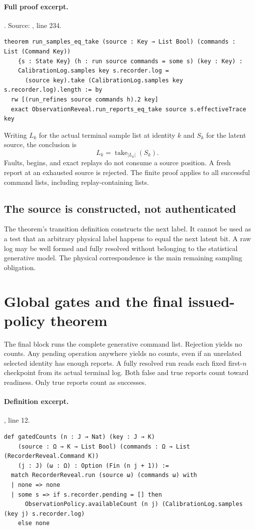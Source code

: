 \documentclass[11pt]{article}
\begin{document}
\paragraph{Full proof excerpt.}. Source: , line 234.
\begin{lstlisting}[style=AVOCSource]
theorem run_samples_eq_take (source : Key → List Bool) (commands : List (Command Key))
    {s : State Key} (h : run source commands = some s) (key : Key) :
    CalibrationLog.samples key s.recorder.log =
      (source key).take (CalibrationLog.samples key s.recorder.log).length := by
  rw [(run_refines source commands h).2 key]
  exact ObservationReveal.run_reports_eq_take source s.effectiveTrace key
\end{lstlisting}


Writing $L_k$ for the actual terminal sample list at identity $k$ and $S_k$ for
the latent source, the conclusion is
\[
 L_k=\operatorname{take}_{|L_k|}(S_k).
\]
Faults, begins, and exact replays do not consume a source position. A fresh
report at an exhausted source is rejected. The finite proof applies to all
successful command lists, including replay-containing lists.

\subsection{The source is constructed, not authenticated}
The theorem's transition definition constructs the next label. It cannot be
used as a test that an arbitrary physical label happens to equal the next
latent bit. A raw log may be well formed and fully resolved without belonging
to the statistical generative model. The physical correspondence is the main
remaining sampling obligation.

\section{Global gates and the final issued-policy theorem}
\label{sec:final}
The final block runs the complete generative command list. Rejection yields no
counts. Any pending operation anywhere yields no counts, even if an unrelated
selected identity has enough reports. A fully resolved run reads each fixed
first-$n$ checkpoint from its actual terminal log. Both false and true reports
count toward readiness. Only true reports count as successes.

\paragraph{Definition excerpt.}, line 12.
\begin{lstlisting}[style=AVOCSource]
def gatedCounts (n : J → Nat) (key : J → K)
    (source : Ω → K → List Bool) (commands : Ω → List (RecorderReveal.Command K))
    (j : J) (ω : Ω) : Option (Fin (n j + 1)) :=
  match RecorderReveal.run (source ω) (commands ω) with
  | none => none
  | some s => if s.recorder.pending = [] then
      ObservationPolicy.availableCount (n j) (CalibrationLog.samples (key j) s.recorder.log)
    else none
\end{lstlisting}
\end{document}
